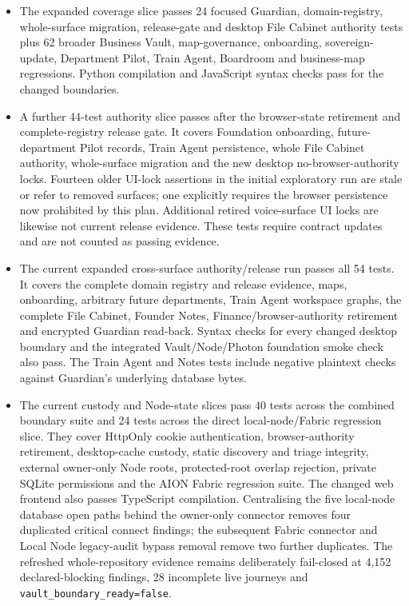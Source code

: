 \documentclass[11pt]{article}
\newcommand{\code}[1]{\texttt{#1}}
\begin{document}
\begin{itemize}
  \item The expanded coverage slice passes 24 focused Guardian, domain-registry, whole-surface migration, release-gate and desktop File Cabinet authority tests plus 62 broader Business Vault, map-governance, onboarding, sovereign-update, Department Pilot, Train Agent, Boardroom and business-map regressions. Python compilation and JavaScript syntax checks pass for the changed boundaries.
  \item A further 44-test authority slice passes after the browser-state retirement and complete-registry release gate. It covers Foundation onboarding, future-department Pilot records, Train Agent persistence, whole File Cabinet authority, whole-surface migration and the new desktop no-browser-authority locks. Fourteen older UI-lock assertions in the initial exploratory run are stale or refer to removed surfaces; one explicitly requires the browser persistence now prohibited by this plan. Additional retired voice-surface UI locks are likewise not current release evidence. These tests require contract updates and are not counted as passing evidence.
  \item The current expanded cross-surface authority/release run passes all 54 tests. It covers the complete domain registry and release evidence, maps, onboarding, arbitrary future departments, Train Agent workspace graphs, the complete File Cabinet, Founder Notes, Finance/browser-authority retirement and encrypted Guardian read-back. Syntax checks for every changed desktop boundary and the integrated Vault/Node/Photon foundation smoke check also pass. The Train Agent and Notes tests include negative plaintext checks against Guardian's underlying database bytes.
  \item The current custody and Node-state slices pass 40 tests across the combined boundary suite and 24 tests across the direct local-node/Fabric regression slice. They cover HttpOnly cookie authentication, browser-authority retirement, desktop-cache custody, static discovery and triage integrity, external owner-only Node roots, protected-root overlap rejection, private SQLite permissions and the AION Fabric regression suite. The changed web frontend also passes TypeScript compilation. Centralising the five local-node database open paths behind the owner-only connector removes four duplicated critical connect findings; the subsequent Fabric connector and Local Node legacy-audit bypass removal remove two further duplicates. The refreshed whole-repository evidence remains deliberately fail-closed at 4,152 declared-blocking findings, 28 incomplete live journeys and \code{vault\_boundary\_ready=false}.

\end{itemize}
\end{document}
